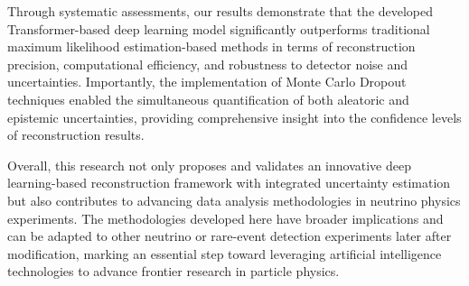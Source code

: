 \begin{enabstract}
Through systematic assessments, our results 
demonstrate that the developed Transformer-based deep learning model 
significantly outperforms traditional maximum likelihood estimation-based methods in 
terms of reconstruction precision, computational efficiency, 
and robustness to detector noise and uncertainties. Importantly, 
the implementation of Monte Carlo Dropout techniques enabled the 
simultaneous quantification of both aleatoric and epistemic 
uncertainties, providing comprehensive insight into the 
confidence levels of reconstruction results.

Overall, this research not only proposes and validates an 
innovative deep learning-based reconstruction framework with integrated 
uncertainty estimation but also contributes to 
advancing data analysis methodologies in neutrino physics experiments. 
The methodologies developed here have broader implications and can 
be adapted to other neutrino or rare-event detection experiments 
later after modification, marking an essential step toward 
leveraging artificial intelligence technologies to advance 
frontier research in particle physics.


\end{enabstract}

